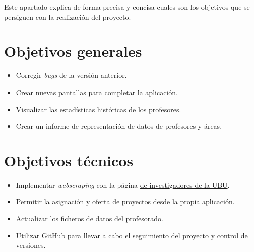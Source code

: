 
Este apartado explica de forma precisa y concisa cuales son los objetivos que se persiguen con la realización del proyecto.

\section{Objetivos generales}
\begin{itemize}
	\item Corregir \emph{bugs} de la versión anterior.
	\item Crear nuevas pantallas para completar la aplicación.
	\item Visualizar las estadísticas históricas de los profesores.
	\item Crear un informe de representación de datos de profesores y áreas.
\end{itemize}
\section{Objetivos técnicos}
\begin{itemize}
	\item Implementar \emph{webscraping} con la página \href{https://investigacion.ubu.es/unidades/2682/investigadores}{de investigadores de la UBU}.
	\item Permitir la asignación y oferta de proyectos desde la propia aplicación.
	\item Actualizar los ficheros de datos del profesorado.
	\item Utilizar GitHub para llevar a cabo el seguimiento del proyecto y control de versiones.
\end{itemize}